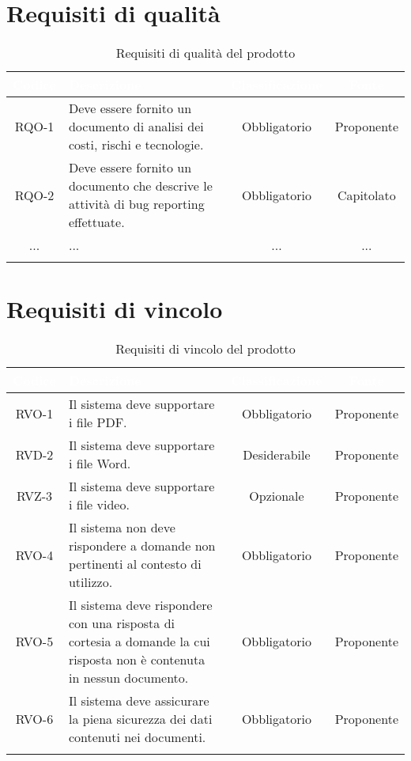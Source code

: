 \section{Requisiti di qualità}

\begingroup
\setlength{\tabcolsep}{10pt}
\renewcommand{\arraystretch}{1.5}
\begin{xltabular}{\textwidth}{| c | X | c | c |}
    \hline
     \textbf{\textcolor{white}{Codice}} & \textbf{\textcolor{white}{Descrizione}} & \textbf{\textcolor{white}{Classificazione}} & \textbf{\textcolor{white}{Fonte}}\\
    \hline
    \endhead
    RQO-1 & Deve essere fornito un documento di analisi dei costi, rischi e tecnologie. & Obbligatorio & Proponente \\
    \hline
    RQO-2 & Deve essere fornito un documento che descrive le attività di bug reporting effettuate. & Obbligatorio & Capitolato \\
    \hline
    ... & ... & ... & ... \\
    \hline
     \caption{Requisiti di qualità del prodotto}
    \label{tab:reqqua}
\end{xltabular}
\endgroup

\section{Requisiti di vincolo}

\begingroup
\setlength{\tabcolsep}{10pt}
\renewcommand{\arraystretch}{1.5}
\begin{xltabular}{\textwidth}{| c | X | c | c |}
    \hline
     \textbf{\textcolor{white}{Codice}} & \textbf{\textcolor{white}{Descrizione}} & \textbf{\textcolor{white}{Classificazione}} & \textbf{\textcolor{white}{Fonte}}\\
    \hline
    \endhead
    RVO-1 & Il sistema deve supportare i file PDF. & Obbligatorio & Proponente \\
    \hline
    RVD-2 & Il sistema deve supportare i file Word. & Desiderabile & Proponente \\
    \hline
    RVZ-3 & Il sistema deve supportare i file video. & Opzionale & Proponente \\
    \hline
    RVO-4 & Il sistema non deve rispondere a domande non pertinenti al contesto di utilizzo. & Obbligatorio & Proponente \\
    \hline
    RVO-5 & Il sistema deve rispondere con una risposta di cortesia a domande la cui risposta non è contenuta in nessun documento. & Obbligatorio & Proponente \\
    \hline
    RVO-6 & Il sistema deve assicurare la piena sicurezza dei dati contenuti nei documenti. & Obbligatorio & Proponente \\
    \hline
     \caption{Requisiti di vincolo del prodotto}
    \label{tab:reqvin}
\end{xltabular}
\endgroup

